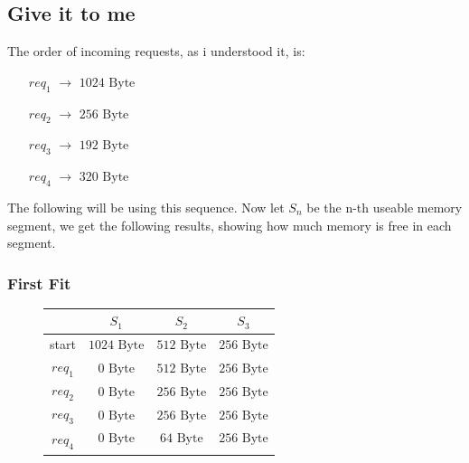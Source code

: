 \documentclass[a4paper, 11pt]{article}
\begin{document}
    \subsection{Give it to me}
    The order of incoming requests, as i understood it, is:
    \begin{enumerate}[leftmargin=\parindent+.4in]
          \item[$req_1$ $\rightarrow$] $1024 \mbox{ Byte}$
          \item[$req_2$ $\rightarrow$] $256 \mbox{ Byte}$
          \item[$req_3$ $\rightarrow$] $192 \mbox{ Byte}$
          \item[$req_4$ $\rightarrow$] $320 \mbox{ Byte}$ 
    \end{enumerate}
    
    The following will be using this sequence. Now let $S_n$ be the n-th useable memory segment, we get the following results, showing how much memory is free in each segment.
    \subsubsection{First Fit}
    \begin{figure}[h]
          \centering
          \begin{tabular}{|c|c|c|c|}
            \hline
            &$S_1$&$S_2$&$S_3$\\\hline
            start&$1024 \mbox{ Byte}$&$512 \mbox{ Byte}$&$256 \mbox{ Byte}$\\
            $req_1$&$0 \mbox{ Byte}$&$512 \mbox{ Byte}$&$256 \mbox{ Byte}$\\
            $req_2$&$0 \mbox{ Byte}$&$256 \mbox{ Byte}$&$256 \mbox{ Byte}$\\
            $req_3$&$0 \mbox{ Byte}$&$256 \mbox{ Byte}$&$256 \mbox{ Byte}$\\\hline\hline
            \multirow{2}{*}{$req_4$}&$0 \mbox{ Byte}$&$64 \mbox{ Byte}$&$256 \mbox{ Byte}$\\ \cline{2-4}&\multicolumn{3}{c|}{\color{red}{Cannot fit into $S_2$}}\\
            \hline
      
          \end{tabular}
    \end{figure}
\end{document}
